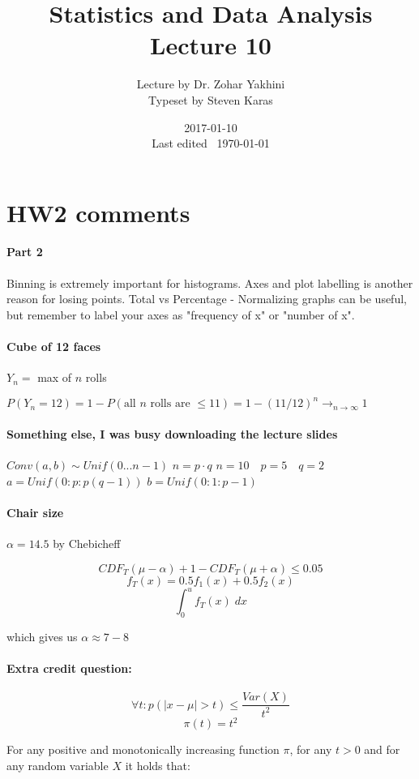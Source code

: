 \documentclass[a4paper]{article}
\title{Statistics and Data Analysis\\\large Lecture 10}
\date{2017-01-10 \\ Last edited \currenttime\ \today}
\author{Lecture by Dr. Zohar Yakhini\\Typeset by Steven Karas}
\begin{document}
\maketitle

\section{HW2 comments}

\paragraph{Part 2}
Binning is extremely important for histograms.
Axes and plot labelling is another reason for losing points.
Total vs Percentage - Normalizing graphs can be useful, but remember to label your axes as "frequency of x" or "number of x".

\paragraph{Cube of 12 faces}
$Y_n =$ max of $n$ rolls

$P(Y_n=12)=1-P(\text{all $n$ rolls are }\le 11)=1-(11/12)^n \to_{n\to\infty} 1$

\paragraph{Something else, I was busy downloading the lecture slides}
$Conv(a,b) \sim Unif(0...n-1)$
$n=p\cdot q$
$n = 10 \quad p = 5 \quad q = 2$
$a = Unif(0:p:p(q-1))$
$b = Unif(0:1:p-1)$

\paragraph{Chair size}

$\alpha = 14.5$ by Chebicheff

\[CDF_T(\mu-\alpha) + 1 - CDF_T(\mu + \alpha) \le 0.05\]
\[f_T(x)=0.5f_1(x)+ 0.5 f_2(x)\]
\[\int_0^u f_T(x) \; dx\]

which gives us $\alpha \approx 7-8$

\paragraph{Extra credit question:}
\[\forall t : p(|x-\mu|>t) \le \frac{Var(X)}{t^2}\]
\[\pi(t)=t^2\]

For any positive and monotonically increasing function $\pi$, for any $t > 0$ and for any random variable $X$ it holds that:
\end{document}
